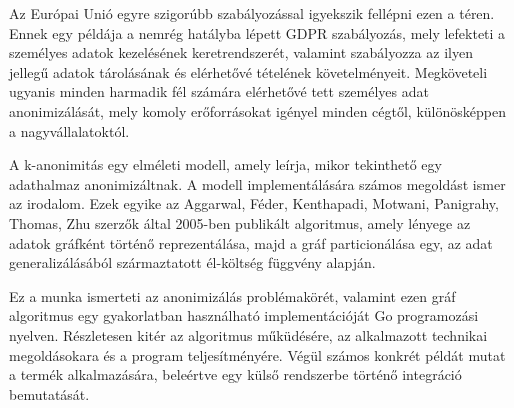 Az Európai Unió egyre szigorúbb szabályozással igyekszik fellépni ezen a téren. Ennek egy példája a nemrég hatályba lépett GDPR szabályozás, mely lefekteti a személyes adatok kezelésének keretrendszerét, valamint szabályozza az ilyen jellegű adatok tárolásának és elérhetővé tételének követelményeit. Megköveteli ugyanis minden harmadik fél számára elérhetővé tett személyes adat anonimizálását, mely komoly erőforrásokat igényel minden cégtől, különösképpen a nagyvállalatoktól.

A k-anonimitás egy elméleti modell, amely leírja, mikor tekinthető egy adathalmaz anonimizáltnak. A modell implementálására számos megoldást ismer az irodalom. Ezek egyike az Aggarwal, Féder, Kenthapadi, Motwani, Panigrahy, Thomas, Zhu szerzők által 2005-ben publikált algoritmus, amely lényege az adatok gráfként történő reprezentálása, majd a gráf particionálása egy, az adat generalizálásából származtatott él-költség függvény alapján.

Ez a munka ismerteti az anonimizálás problémakörét, valamint ezen gráf algoritmus egy gyakorlatban használható implementációját Go programozási nyelven. Részletesen kitér az algoritmus műküdésére, az alkalmazott technikai megoldásokara és a program teljesítményére. Végül számos konkrét példát mutat a termék alkalmazására, beleértve egy külső rendszerbe történő integráció bemutatását.

\clearpage
\thispagestyle{empty}